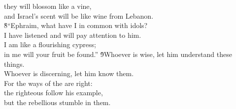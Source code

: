 \begin{poetry}
\poeml they will blossom like a vine, \\
\poemll    and Israel's scent will be like wine from Lebanon. \\
\poeml \v{8}``Ephraim, what have I in common with idols? \\
\poemll    I have listened and will pay attention to him. \\
\poeml I am like a flourishing cypress; \\
\poemll    in me will your fruit be found.''
\poeml \v{9}Whoever is wise, let him understand these things. \\
\poemll    Whoever is discerning, let him know them. \\
\poeml For the ways of the  are right: \\
\poemll    the righteous follow his example, \\
\poemlll       but the rebellious stumble in them.\end{poetry}
